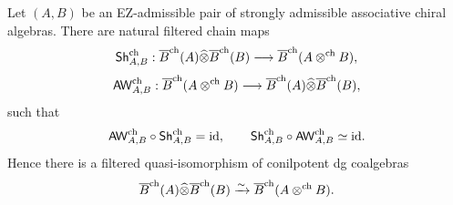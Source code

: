 \begin{theorem}
\ClaimStatusProvedHere
\label{thm:shuffle}
Let $(A,B)$ be an EZ-admissible pair of strongly admissible associative chiral algebras.
There are natural filtered chain maps
\[
\mathsf{Sh}^{\mathrm{ch}}_{A,B}:
\overline{B}^{\mathrm{ch}}(A)\widehat\otimes \overline{B}^{\mathrm{ch}}(B)\longrightarrow \overline{B}^{\mathrm{ch}}(A\mathbin{\otimes^{\mathrm{ch}}} B),
\]
\[
\mathsf{AW}^{\mathrm{ch}}_{A,B}:
\overline{B}^{\mathrm{ch}}(A\mathbin{\otimes^{\mathrm{ch}}} B)\longrightarrow \overline{B}^{\mathrm{ch}}(A)\widehat\otimes \overline{B}^{\mathrm{ch}}(B),
\]
such that
\[
\mathsf{AW}^{\mathrm{ch}}_{A,B}\circ \mathsf{Sh}^{\mathrm{ch}}_{A,B}=\mathrm{id},
\qquad
\mathsf{Sh}^{\mathrm{ch}}_{A,B}\circ \mathsf{AW}^{\mathrm{ch}}_{A,B}\simeq \mathrm{id}.
\]
Hence there is a filtered quasi-isomorphism of conilpotent dg coalgebras
\[
\overline{B}^{\mathrm{ch}}(A)\widehat\otimes \overline{B}^{\mathrm{ch}}(B)\xrightarrow{\sim}\overline{B}^{\mathrm{ch}}(A\mathbin{\otimes^{\mathrm{ch}}} B).
\]
\end{theorem}

